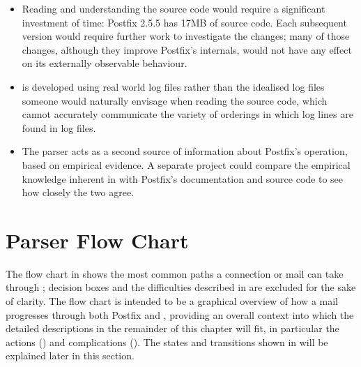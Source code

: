 \begin{itemize}

    \item Reading and understanding the source code would require a
        significant investment of time: Postfix 2.5.5 has 17MB of source
        code.  Each subsequent version would require further work to
        investigate the changes; many of those changes, although they
        improve Postfix's internals, would not have any effect on its
        externally observable behaviour.

    \item \parsername{} is developed using real world log files rather than
        the idealised log files someone would naturally envisage when
        reading the source code, which cannot accurately communicate the
        variety of orderings in which log lines are found in log files.

    \item The parser acts as a second source of information about Postfix's
        operation, based on empirical evidence.  A separate project could
        compare the empirical knowledge inherent in \parsername{} with
        Postfix's documentation and source code to see how closely the two
        agree.

\end{itemize}



\section{Parser Flow Chart}

\label{flow chart}

The flow chart in  shows the most common paths
a connection or mail can take through \parsername{}; decision boxes and the
difficulties described in  are excluded for the
sake of clarity.  The flow chart is intended to be a graphical overview of
how a mail progresses through both Postfix and \parsername{}, providing an
overall context into which the detailed descriptions in the remainder of
this chapter will fit, in particular the actions () and complications ().  The
states and transitions shown in  will be
explained later in this section.


